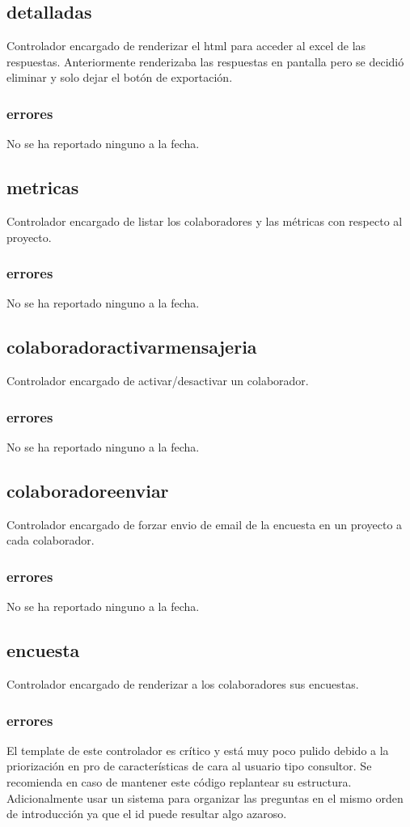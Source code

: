\documentclass[10pt,a4paper]{book}
\begin{document}
	\subsection{detalladas}
	Controlador encargado de renderizar el html para acceder al excel de las respuestas. Anteriormente renderizaba las respuestas en pantalla pero se decidió eliminar y solo dejar el botón  de exportación.
	\subsubsection{errores}
	No se ha reportado ninguno a la fecha.
	
	\subsection{metricas}
	Controlador encargado de listar los colaboradores y las métricas con respecto al proyecto.
	\subsubsection{errores}
	No se ha reportado ninguno a la fecha.
	
	\subsection{colaboradoractivarmensajeria}
	Controlador encargado de activar/desactivar un colaborador.
	\subsubsection{errores}
	No se ha reportado ninguno a la fecha.
	
	\subsection{colaboradoreenviar}
	Controlador encargado de forzar envio de email de la encuesta en un proyecto a cada colaborador.
	\subsubsection{errores}
	No se ha reportado ninguno a la fecha.
	
	\subsection{encuesta}
	Controlador encargado de renderizar a los colaboradores sus encuestas.
	\subsubsection{errores}
	El template de este controlador es crítico y está muy poco pulido debido a la priorización en pro de características de cara al usuario tipo consultor. Se recomienda en caso de mantener este código replantear su estructura. Adicionalmente usar un sistema para organizar las preguntas en el mismo orden de introducción ya que el id puede resultar algo azaroso.
	
\end{document}
